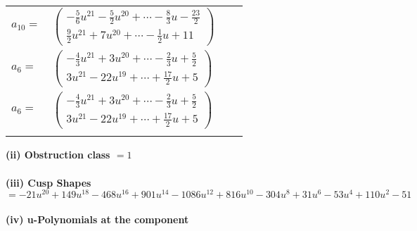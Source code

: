\documentclass[1p]{elsarticle_modified}
\theoremstyle{definition}
\begin{document}
\begin{tabular}{m{7pt} m{180pt} m{7pt} m{180pt} }
\flushright $a_{10}=$&$\begin{pmatrix}-\frac{5}{6} u^{21}-\frac{5}{2} u^{20}+\cdots-\frac{8}{3} u-\frac{23}{2}\\\frac{9}{2} u^{21}+7 u^{20}+\cdots-\frac{1}{2} u+11\end{pmatrix}$ \\
\flushright $a_{6}=$&$\begin{pmatrix}-\frac{4}{3} u^{21}+3 u^{20}+\cdots-\frac{2}{3} u+\frac{5}{2}\\3 u^{21}-22 u^{19}+\cdots+\frac{17}{2} u+5\end{pmatrix}$\\ \flushright $a_{6}=$&$\begin{pmatrix}-\frac{4}{3} u^{21}+3 u^{20}+\cdots-\frac{2}{3} u+\frac{5}{2}\\3 u^{21}-22 u^{19}+\cdots+\frac{17}{2} u+5\end{pmatrix}$\\&\end{tabular}
\flushleft \textbf{(ii) Obstruction class $= 1$}\\~\\
\flushleft \textbf{(iii) Cusp Shapes $= -21 u^{20}+149 u^{18}-468 u^{16}+901 u^{14}-1086 u^{12}+816 u^{10}-304 u^8+31 u^6-53 u^4+110 u^2-51$}\\~\\
\newpage\renewcommand{\arraystretch}{1}
\flushleft \textbf{(iv) u-Polynomials at the component}\newline \\
\end{document}
